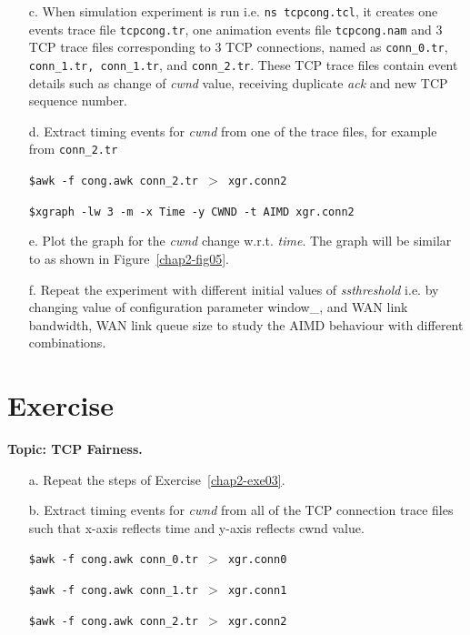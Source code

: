 \begin{multicols}{2}
\begin{itemize}
\item[c.] When simulation experiment is run i.e. \texttt{ns tcpcong.tcl}, it creates one events trace file \texttt{tcpcong.tr}, one animation events file \texttt{tcpcong.nam} and 3 TCP trace files corresponding to 3 TCP connections, named as \texttt{conn\_0.tr}, \texttt{conn\_1.tr, conn\_1.tr}, and \texttt{conn\_2.tr}. These TCP trace files contain event details such as change of \textit{cwnd} value, receiving duplicate \textit{ack} and new TCP sequence number.

\item[d.] Extract timing events for \textit{cwnd} from one of the trace files, for example from \texttt{conn\_2.tr}

\texttt{\$awk -f cong.awk conn\_2.tr $>$ xgr.conn2}

\texttt{\$xgraph -lw 3 -m -x Time -y CWND -t AIMD xgr.conn2}

\item[e.] Plot the graph for the \textit{cwnd} change w.r.t. \textit{time}. The graph will be similar to as shown in Figure~\ref{chap2-fig05}.

\item[f.] Repeat the experiment with different initial values of \textit{ssthreshold} i.e. by changing value of configuration parameter window\_, and WAN link bandwidth, WAN link queue size to study the AIMD behaviour with different combinations.
\end{itemize}

\section*{Exercise \label{chap2-exe04}}

\textbf{Topic: TCP Fairness.}

\begin{itemize}

\item[a.] Repeat the steps of Exercise~\ref{chap2-exe03}.

\item[b.] Extract timing events for \textit{cwnd} from all of the TCP connection trace files such that x-axis reflects time and y-axis reflects cwnd value.

\texttt{\$awk -f cong.awk conn\_0.tr $>$ xgr.conn0}

\texttt{\$awk -f cong.awk conn\_1.tr $>$ xgr.conn1}

\texttt{\$awk -f cong.awk conn\_2.tr $>$ xgr.conn2}


\end{itemize}
\end{multicols}
